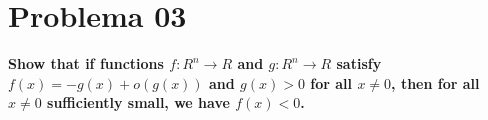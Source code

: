 \section*{Problema 03}

\textbf{Show that if functions $f : R^n \rightarrow R$ and $g : R^n \rightarrow R$ satisfy $f (x) = -g(x) + o(g(x))$ and $g(x) > 0$ for all $x \neq 0$, then for all $x \neq 0$ sufficiently small, we have $f (x) < 0$.}